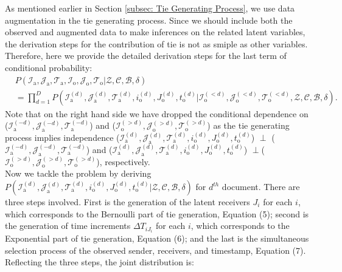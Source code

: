 \documentclass[a4paper]{article}
\begin{document}
  As mentioned earlier in Section \ref{subsec: Tie Generating Process}, we use data augmentation in the tie generating process. Since we should include both the observed and augmented data to make inferences on the related latent variables, the derivation steps for the contribution of tie is not as smiple as other variables. Therefore, here we provide the detailed derivation steps for the last term of conditional probability: 
 \begin{equation}
\begin{aligned}
&P(\mathcal{I}_{\mbox{a}}, \mathcal{J}_{\mbox{a}}, \mathcal{T}_{\mbox{a}},\mathcal{I}_{\mbox{o}}, \mathcal{J}_{\mbox{o}}, \mathcal{T}_{\mbox{o}} |\mathcal{Z}, \mathcal{C}, \mathcal{B}, \delta)\\& = \prod_{d=1}^D P(\mathcal{I}^{(d)}_{\mbox{a}}, \mathcal{J}^{(d)}_{\mbox{a}}, \mathcal{T}^{(d)}_{\mbox{a}}, i^{(d)}_{\mbox{o}}, J^{(d)}_{\mbox{o}}, t^{(d)}_{\mbox{o}} |\mathcal{I}^{(<d)}_{\mbox{o}}, \mathcal{J}^{(<d)}_{\mbox{o}}, \mathcal{T}^{(<d)}_{\mbox{o}},\mathcal{Z}, \mathcal{C}, \mathcal{B}, \delta).
\end{aligned}
 \end{equation}
Note that on the right hand side we have dropped the conditional dependence on ($\mathcal{I}^{(-d)}_{\mbox{a}}, \mathcal{J}^{(-d)}_{\mbox{a}}, \mathcal{T}^{(-d)}_{\mbox{a}}$) and ($\mathcal{I}^{(>d)}_{\mbox{o}}, \mathcal{J}^{(>d)}_{\mbox{o}}, \mathcal{T}^{(>d)}_{\mbox{o}}$) as the tie generating process implies independence ($\mathcal{I}^{(d)}_{\mbox{a}}, \mathcal{J}^{(d)}_{\mbox{a}}, \mathcal{T}^{(d)}_{\mbox{a}}, i^{(d)}_{\mbox{o}}, J^{(d)}_{\mbox{o}}, t^{(d)}_{\mbox{o}}$) $\perp$ ($\mathcal{I}^{(-d)}_{\mbox{a}}, \mathcal{J}^{(-d)}_{\mbox{a}}, \mathcal{T}^{(-d)}_{\mbox{a}}$) and  ($\mathcal{I}^{(d)}_{\mbox{a}}, \mathcal{J}^{(d)}_{\mbox{a}}, \mathcal{T}^{(d)}_{\mbox{a}}, i^{(d)}_{\mbox{o}}, J^{(d)}_{\mbox{o}}, t^{(d)}_{\mbox{o}}$) $\perp$($\mathcal{I}^{(>d)}_{\mbox{o}}, \mathcal{J}^{(>d)}_{\mbox{o}}, \mathcal{T}^{(>d)}_{\mbox{o}}$), respectively. \\\newline  Now we tackle the problem by deriving $P(\mathcal{I}^{(d)}_{\mbox{a}}, \mathcal{J}^{(d)}_{\mbox{a}}, \mathcal{T}^{(d)}_{\mbox{a}}, i^{(d)}_{\mbox{o}}, J^{(d)}_{\mbox{o}}, t^{(d)}_{\mbox{o}} |\mathcal{Z}, \mathcal{C}, \mathcal{B}, \delta)$ for $d^{th}$ document. There are three steps involved. First is the generation of the latent receivers $J_i$ for each $i$, which corresponds to the Bernoulli part of tie generation, Equation (5); second is the generation of time increments $\Delta T_{iJ_i}$ for each $i$, which corresponds to the Exponential part of tie generation, Equation (6); and the last is the simultaneous selection process of the observed sender, receivers, and timestamp, Equation (7). Reflecting the three steps, the joint distribution is:\\
\end{document}
